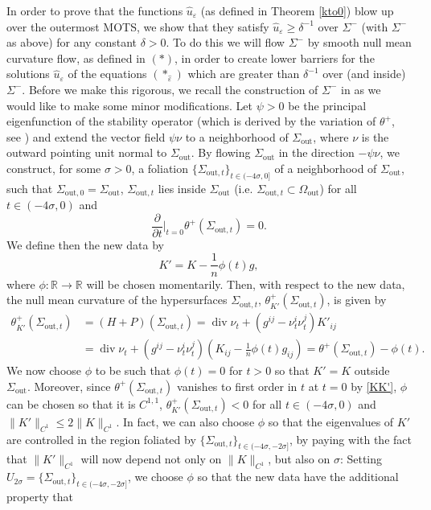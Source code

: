 \documentclass[11pt]{amsart}
\renewcommand{\epsilon}{\varepsilon}
\DeclareMathOperator{\dvg}{div} \DeclareMathOperator{\spt}{spt}
\def\R{\mathbb{R}}
\def\e{\epsilon}
\def\s{\sigma}
\def\out{\text{out}}
\begin{document}
In order to prove that the functions $\hat u_\e$ (as defined in Theorem  \ref{kto0}) blow up over the outermost MOTS, we show that they satisfy $\hat u_\e\ge \delta^{-1}$ over  $\Sigma^-$ (with $\Sigma^-$ as above) for any constant $\delta>0$. To do this we will flow $\Sigma^-$ by  smooth null mean curvature flow, as defined in $(*)$, in order to create lower barriers for the solutions $\hat u_{\e}$ of the equations $({*_{\hat{\varepsilon}}})$ which are greater than $\delta^{-1}$ over (and inside) $\Sigma^-$.
Before we make this rigorous, we recall the construction of $\Sigma^-$ in \cite[Theorem 5.1]{AM09} as we would like to make some minor modifications.
Let $\psi>0$ be the principal eigenfunction of the stability operator (which is derived by the variation of $\theta^+$, see \cite{AMS08, AM09}) and extend the vector field $\psi\nu$ to a neighborhood of $\Sigma_\out$, where $\nu$ is the outward pointing unit normal to $\Sigma_\out$. By flowing $\Sigma_\out$ in the direction $-\psi\nu$, we construct, for some $\s>0$, a foliation $\{\Sigma_{\out,t}\}_{t\in(-4\s,0]}$ of a neighborhood of $\Sigma_\out$, such that $\Sigma_{\out, 0}=\Sigma_\out$, $\Sigma_{\out, t}$  lies inside  $\Sigma_\out$ (i.e. $\Sigma_{\out, t}\subset\Omega_\out$) for all $t\in (-4\s,0)$ and 
\begin{equation}\label{KK'}
\frac{\partial}{\partial t}\bigg|_{t=0}\theta^+(\Sigma_{\out, t})=0.
\end{equation}
We define then the new data by
\begin{equation}\label{K'}
K'=K-\frac{1}{n}\phi(t)g,
\end{equation}
where  $\phi:\R\to\R$ will be chosen momentarily. Then, with respect to the new data, the null mean curvature of the hypersurfaces $\Sigma_{\out, t}$, $\theta_{K'}^+(\Sigma_{\out, t})$, is given by
\[\begin{split}\theta_{K'}^+(\Sigma_{\out, t})&=(H+P)(\Sigma_{\out,t})=\dvg\nu_t+(g^{ij}-\nu_t^i\nu_t^j)K'_{ij}\\
&=\dvg\nu_t+(g^{ij}-\nu_t^i\nu_t^j)\left(K_{ij}-\frac{1}{n}\phi(t)g_{ij}\right)=\theta^+(\Sigma_{\out, t})-\phi(t).
\end{split}\]
We now choose $\phi$ to be such that $\phi(t)=0$ for  $t> 0$ so that $K'=K$ outside $\Sigma_\out$.
Moreover, since $\theta^+(\Sigma_{\out, t})$ vanishes to first order in $t$ at $t = 0$ by \eqref{KK'},  $\phi$ can be chosen so that it is $C^{1,1}$,  $\theta_{K'}^+(\Sigma_{\out, t})<0$ for all $t\in(-4\s,0)$  and  $\|K'\|_{C^1}\le 2\|K\|_{C^1}$. 
In fact, we can also choose $\phi$ so that  the eigenvalues of $K'$ are controlled in the region foliated by $\{\Sigma_{\out,t}\}_{t\in(-4\s,-2\s]}$, by paying with the fact that $\|K'\|_{C^1}$ will now depend not only on $\|K\|_{C^1}$, but also on $\s$: Setting $U_{2\s}=\{\Sigma_{\out,t}\}_{t\in(-4\s,-2\s]}$, we choose $\phi$ so that the new data have the additional property that
\end{document}
